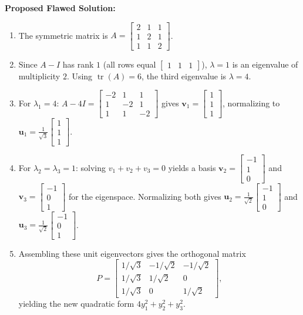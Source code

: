 \documentclass[11pt, letterpaper]{article}
\theoremstyle{definition}
\theoremstyle{remark}
\begin{document}
\textbf{Proposed Flawed Solution:}
\begin{enumerate}
    \item The symmetric matrix is $A = \begin{bmatrix} 2 & 1 & 1 \\ 1 & 2 & 1 \\ 1 & 1 & 2 \end{bmatrix}$.
    \item Since $A - I$ has rank $1$ (all rows equal $\begin{bmatrix} 1 & 1 & 1 \end{bmatrix}$), $\lambda = 1$ is an eigenvalue of multiplicity $2$. Using $\operatorname{tr}(A) = 6$, the third eigenvalue is $\lambda = 4$.
    \item For $\lambda_1 = 4$: $A - 4I = \begin{bmatrix} -2 & 1 & 1 \\ 1 & -2 & 1 \\ 1 & 1 & -2 \end{bmatrix}$ gives $\mathbf{v}_1 = \begin{bmatrix} 1 \\ 1 \\ 1 \end{bmatrix}$, normalizing to $\mathbf{u}_1 = \frac{1}{\sqrt{3}}\begin{bmatrix} 1 \\ 1 \\ 1 \end{bmatrix}$.
    \item For $\lambda_2 = \lambda_3 = 1$: solving $v_1 + v_2 + v_3 = 0$ yields a basis $\mathbf{v}_2 = \begin{bmatrix} -1 \\ 1 \\ 0 \end{bmatrix}$ and $\mathbf{v}_3 = \begin{bmatrix} -1 \\ 0 \\ 1 \end{bmatrix}$ for the eigenspace. Normalizing both gives $\mathbf{u}_2 = \frac{1}{\sqrt{2}}\begin{bmatrix} -1 \\ 1 \\ 0 \end{bmatrix}$ and $\mathbf{u}_3 = \frac{1}{\sqrt{2}}\begin{bmatrix} -1 \\ 0 \\ 1 \end{bmatrix}$.
    \item Assembling these unit eigenvectors gives the orthogonal matrix
    \[
    P = \begin{bmatrix} 1/\sqrt{3} & -1/\sqrt{2} & -1/\sqrt{2} \\ 1/\sqrt{3} & 1/\sqrt{2} & 0 \\ 1/\sqrt{3} & 0 & 1/\sqrt{2} \end{bmatrix},
    \]
    yielding the new quadratic form $4y_1^2 + y_2^2 + y_3^2$.
\end{enumerate}
\end{document}
